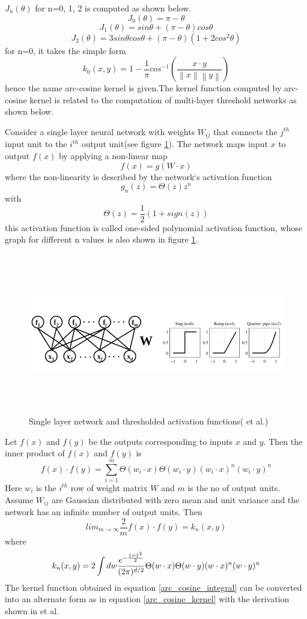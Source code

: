 $J_n(\theta)$ for n=0, 1, 2 is computed as shown below.
\[ J_0(\theta) = \pi-\theta \]
\[ J_1(\theta) = sin\theta + (\pi-\theta)cos\theta \]
\[ J_2(\theta) = 3sin\theta cos\theta + (\pi-\theta)(1+2cos^2\theta) \]
for n=0, it takes the simple form
\[k_0(x,y) =  1- \frac{1}{\pi}cos^{-1}\left ( \frac{x\cdot y}{\left \| x \right \| \left \| y \right \|} \right )  \]
hence the name arc-cosine kernel is given.The kernel function computed by arc-cosine kernel is related to the computation of multi-layer threshold networks as shown below.

Consider a single layer neural network with weights $W_{ij}$ that connects the $j^{th}$ input unit to the $i^{th}$ output unit(see figure \ref{fig_singnet}). The network maps input $x$ to output $f(x)$ by applying a non-linear map 
\[ f(x) = g(W \cdot x) \]
where the non-linearity is described by the network`s activation function
\[g_n(z) = \Theta(z)z^n \]
with 
\[ \Theta(z) = \frac{1}{2}(1+sign(z)) \]
this activation function is called one-sided polynomial activation function, whose graph for different n values is also shown in figure \ref{fig_singnet}.

\begin{figure}[H]
  \centering
  \captionsetup{justification=centering,margin=0.1cm}
  \includegraphics[width=1.0\linewidth, height=7cm]{figures/singnet}
  \caption{Single layer network and thresholded activation functions(\cite{saul} et al.)}
  \label{fig_singnet}
\end{figure}

Let $f(x)$ and $f(y)$ be the outputs corresponding to inputs $x$ and $y$. Then the inner product of $f(x)$ and $f(y)$ is
\[ f(x)\cdot f(y) = \sum_{i=1}^m \Theta(w_i\cdot x) \Theta(w_i\cdot y)(w_i\cdot x)^n (w_i\cdot y)^n\]
Here $w_i$ is the $i^{th}$ row of weight matrix $W$ and $m$ is the no of output units. Assume $W_{ij}$ are Gaussian distributed with zero mean and unit variance and the network has an infinite number of output units. Then
\[ lim_{m\rightarrow \infty} \frac{2}{m}f(x)\cdot f(y) = k_n(x,y) \]
where
\begin{equation}
k_n(x,y) = 2\int dw \frac{e^{-\frac{\left\lVert w\right\rVert^2}{2}}}{(2\pi )^{d/2}} \Theta (w\cdot x) \Theta (w\cdot y) (w\cdot x)^n (w\cdot y)^n 
\label{arc_cosine_integral}
\end{equation}
The kernel function obtained in equation \ref{arc_cosine_integral} can be converted into an alternate form as in equation \ref{arc_cosine_kernel} with the derivation shown in \cite{saul} et al.


